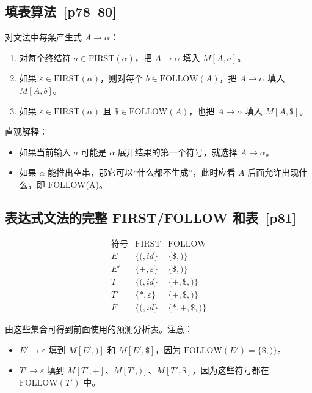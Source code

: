 \documentclass[UTF8,fontset=none,11pt]{ctexart}
\newenvironment{defbox}[1][]{%
  \par\medskip\noindent{\color{defrule}\rule{\linewidth}{1.1pt}}\par\nopagebreak
  \noindent{\bfseries\color{defrule}#1}\par\nopagebreak\smallskip}%
  {\par\nopagebreak\smallskip\noindent{\color{defrule}\rule{\linewidth}{0.4pt}}\par\medskip}
\newcommand{\pg}[1]{\texorpdfstring{{\small\color{graytext}\,[p#1]}}{ [p#1]}}
\newcommand{\eps}{\varepsilon}
\begin{document}
\subsection{填表算法 \pg{78--80}}
\begin{defbox}[LL(1) 分析表构建算法]
对文法中每条产生式 \(A\to\alpha\)：
\begin{enumerate}
  \item 对每个终结符 \(a\in\mathrm{FIRST}(\alpha)\)，把 \(A\to\alpha\) 填入 \(M[A,a]\)。
  \item 如果 \(\eps\in\mathrm{FIRST}(\alpha)\)，则对每个 \(b\in\mathrm{FOLLOW}(A)\)，把 \(A\to\alpha\) 填入 \(M[A,b]\)。
  \item 如果 \(\eps\in\mathrm{FIRST}(\alpha)\) 且 \(\$\in\mathrm{FOLLOW}(A)\)，也把 \(A\to\alpha\) 填入 \(M[A,\$]\)。
\end{enumerate}
\end{defbox}

直观解释：
\begin{itemize}
  \item 如果当前输入 \(a\) 可能是 \(\alpha\) 展开结果的第一个符号，就选择 \(A\to\alpha\)。
  \item 如果 \(\alpha\) 能推出空串，那它可以“什么都不生成”，此时应看 \(A\) 后面允许出现什么，即 FOLLOW(A)。
\end{itemize}

\subsection{表达式文法的完整 FIRST/FOLLOW 和表 \pg{81}}
\[
\begin{array}{c|c|c}
\text{符号} & \mathrm{FIRST} & \mathrm{FOLLOW}\\
\hline
E & \{(,id\} & \{\$,)\}\\
E' & \{+,\eps\} & \{\$,)\}\\
T & \{(,id\} & \{+,\$,)\}\\
T' & \{*,\eps\} & \{+,\$,)\}\\
F & \{(,id\} & \{*,+,\$,)\}
\end{array}
\]

由这些集合可得到前面使用的预测分析表。注意：
\begin{itemize}
  \item \(E'\to\eps\) 填到 \(M[E',)]\) 和 \(M[E',\$]\)，因为 \(\mathrm{FOLLOW}(E')=\{\$,)\}\)。
  \item \(T'\to\eps\) 填到 \(M[T',+]\)、\(M[T',)]\)、\(M[T',\$]\)，因为这些符号都在 \(\mathrm{FOLLOW}(T')\) 中。
\end{itemize}
\end{document}
